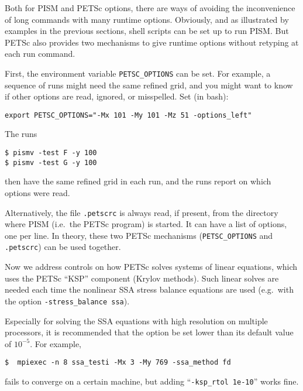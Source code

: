 Both for PISM and PETSc options, there are ways of avoiding the inconvenience of long commands with many runtime options.  Obviously, and as illustrated by examples in the previous sections, shell scripts can be set up to run PISM.  But PETSc also provides two mechanisms to give runtime options without retyping at each run command.

First, the environment variable \texttt{PETSC_OPTIONS} can be set.  For example, a sequence of runs might need the same refined grid, and you might want to know if other options are read, ignored, or misspelled.  Set (in bash):

\texttt{export PETSC_OPTIONS="-Mx 101 -My 101 -Mz 51 -options_left"}

\noindent The runs 
\begin{verbatim}
$ pismv -test F -y 100
$ pismv -test G -y 100
\end{verbatim}
\noindent then have the same refined grid in each run, and the runs report on which options were read.

Alternatively, the file \texttt{.petscrc} is always read, if present, from the directory where PISM (i.e.~the PETSc program) is started.  It can have a list of options, one per line.   In theory, these two PETSc mechanisms (\verb|PETSC_OPTIONS| and \verb|.petscrc|) can be used together.


Now we address controls on how PETSc solves systems of linear equations, which uses the PETSc ``KSP'' component (Krylov methods).  Such linear solves are needed each time the nonlinear SSA stress balance equations are used (e.g.~with the option \texttt{-stress_balance ssa}).

Especially for solving the SSA equations with high resolution on multiple processors, it is recommended that the option  be set lower than its default value of $10^{-5}$.  For example, 

\begin{verbatim}
$  mpiexec -n 8 ssa_testi -Mx 3 -My 769 -ssa_method fd
\end{verbatim}

\noindent fails to converge on a certain machine, but adding ``\verb|-ksp_rtol 1e-10|'' works fine.

